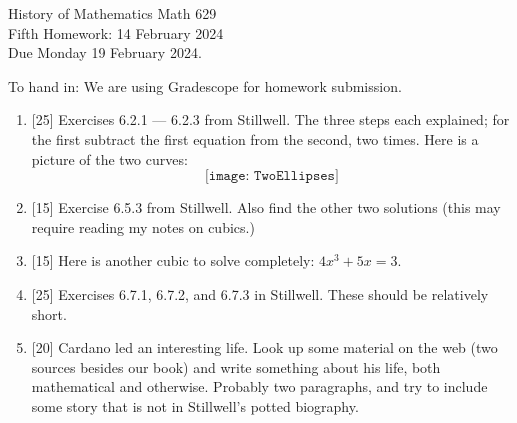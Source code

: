 \documentclass[12pt]{article}
\begin{document}
\LARGE 
\noindent
{\color{Maroon}History of Mathematics \hfill Math 629}\vspace{2pt}\\
\large
Fifth Homework: \hfill 14 February 2024\\
Due Monday 19 February 2024.
\normalsize\vspace{10pt}

To hand in: We are using Gradescope for homework submission.


\begin{enumerate}

\item  {[25]}
  Exercises 6.2.1 --- 6.2.3 from Stillwell.
  The three steps each explained; for the first subtract the first equation from the second, two times.
  Here is a picture of the two curves:
  \[  \texttt{[image: TwoEllipses]}  \]

   \item  {[15]}
     Exercise  6.5.3 from Stillwell.
    Also find the other two solutions (this may require reading my notes on cubics.)

  \item  {[15]}
    Here is another cubic to solve completely: %
    $4x^3+5x=3$.
 
  \item  {[25]}
    Exercises 6.7.1, 6.7.2, and 6.7.3 in Stillwell. These should be relatively short.

  \item  {[20]}
    Cardano led an interesting life.
    Look up some material on the web (two sources besides our book) and write something about his life, both mathematical
    and otherwise.
    Probably two paragraphs, and try to include some story that is not in Stillwell's potted biography. 
\end{enumerate}
\end{document}
